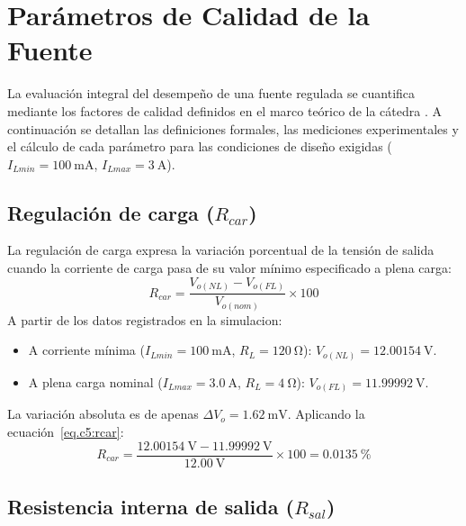 \chapter{Parámetros de Calidad de la Fuente}
\label{sec.c5:parametros_calidad}

La evaluación integral del desempeño de una fuente regulada se cuantifica mediante los factores de calidad
definidos en el marco teórico de la cátedra \cite{gonzalez_fuentes2}. A continuación se detallan las
definiciones formales, las mediciones experimentales y el cálculo de cada parámetro para las condiciones de
diseño exigidas ($I_{Lmin} = \SI{100}{\milli\ampere}$, $I_{Lmax} = \SI{3}{\ampere}$).

\section{Regulación de carga ($R_{car}$)}
\label{sec.c5:rcar}

La regulación de carga expresa la variación porcentual de la tensión de salida cuando la corriente de carga
pasa de su valor mínimo especificado a plena carga:
\begin{equation}
    R_{car} = \frac{V_{o(NL)} - V_{o(FL)}}{V_{o(nom)}} \times 100
    \label{eq.c5:rcar}
\end{equation}
A partir de los datos registrados en la simulacion:
\begin{itemize}
    \item A corriente mínima ($I_{Lmin} = \SI{100}{\milli\ampere}$, $R_L = \SI{120}{\ohm}$):
    $V_{o(NL)} = \SI{12.00154}{\volt}$.
    \item A plena carga nominal ($I_{Lmax} = \SI{3.0}{\ampere}$, $R_L = \SI{4}{\ohm}$):
    $V_{o(FL)} = \SI{11.99992}{\volt}$.
\end{itemize}
La variación absoluta es de apenas $\Delta V_o = \SI{1.62}{\milli\volt}$. Aplicando la ecuación~\eqref{eq.c5:rcar}:
\begin{equation*}
    R_{car} = \frac{\SI{12.00154}{\volt} - \SI{11.99992}{\volt}}{\SI{12.00}{\volt}} \times 100 = \mathbf{\SI{0.0135}{\percent}}
\end{equation*}

\section{Resistencia interna de salida ($R_{sal}$)}
\label{sec.c5:rsal}

